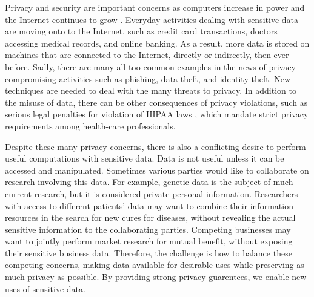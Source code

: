 %
\begin{comment}
\begin{quote}
As every man goes through life he fills in a number of forms for the
record, each containing a number of questions... There are thus hundreds
of little threads radiating from every man, millions of threads in
all. If these threads were suddenly to become visible, the whole sky
would look like a spider's web, and if they materialized as rubber
bands, buses; trams and even people would all lose the ability to
move, and the wind would be unable to carry torn-up newspapers or
autumn leaves along the streets of the city. They are not visible,
they are not material, but every man is constantly aware of their
existence.... Each man, permanently aware of his own invisible threads,
naturally develops a respect for the people who manipulate the threads.

--Alexander Solzhenitsyn, Cancer Ward, 1968.
\end{quote}

\end{comment}
{}
Privacy and security are important concerns as computers increase
in power and the Internet continues to grow \cite{cra99,tur03}. Everyday
activities dealing with sensitive data are moving onto to the Internet,
such as credit card transactions, doctors accessing medical records,
and online banking. As a result, more data is stored on machines that
are connected to the Internet, directly or indirectly, then ever before.
Sadly, there are many all-too-common examples in the news of
privacy compromising activities such as phishing, data theft, and
identity theft. New techniques are needed to deal with the many threats
to privacy. In addition to the misuse of data, there can be other
consequences of privacy violations, such as serious legal penalties
for violation of HIPAA laws \cite{hippa}, which mandate strict privacy
requirements among health-care professionals.

Despite these many privacy concerns, there is also a conflicting desire
to perform useful computations with sensitive data. Data is not useful
unless it can be accessed and manipulated. Sometimes various parties
would like to collaborate on research involving this data. For
example, genetic data is the subject of much current research, but
it is considered private personal information. Researchers with access
to different patients' data may want to combine their information
resources in the search for new cures for diseases, without revealing
the actual sensitive information to the collaborating parties. Competing
businesses may want to jointly perform market research for mutual
benefit, without exposing their sensitive business data. Therefore,
the challenge
is how to balance these competing concerns, making data available
for desirable uses while preserving as much privacy as possible.  By
providing strong privacy guarentees, we enable new uses of sensitive data.

